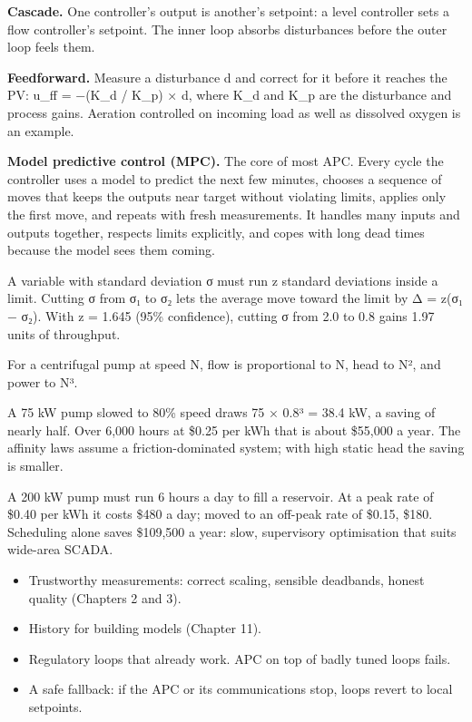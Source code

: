 \textbf{Cascade.} One controller's output is another's setpoint: a level controller sets a flow controller's setpoint. The inner loop absorbs disturbances before the outer loop feels them.

\textbf{Feedforward.} Measure a disturbance d and correct for it before it reaches the PV: u\_ff = −(K\_d / K\_p) × d, where K\_d and K\_p are the disturbance and process gains. Aeration controlled on incoming load as well as dissolved oxygen is an example.

\textbf{Model predictive control (MPC).} The core of most APC. Every cycle the controller uses a model to predict the next few minutes, chooses a sequence of moves that keeps the outputs near target without violating limits, applies only the first move, and repeats with fresh measurements. It handles many inputs and outputs together, respects limits explicitly, and copes with long dead times because the model sees them coming.

 A variable with standard deviation σ must run z standard deviations inside a limit. Cutting σ from σ₁ to σ₂ lets the average move toward the limit by Δ = z(σ₁ − σ₂). With z = 1.645 (95\% confidence), cutting σ from 2.0 to 0.8 gains 1.97 units of throughput.

 For a centrifugal pump at speed N, flow is proportional to N, head to N², and power to N³.

 A 75 kW pump slowed to 80\% speed draws 75 × 0.8³ = 38.4 kW, a saving of nearly half. Over 6,000 hours at \$0.25 per kWh that is about \$55,000 a year. The affinity laws assume a friction-dominated system; with high static head the saving is smaller.

 A 200 kW pump must run 6 hours a day to fill a reservoir. At a peak rate of \$0.40 per kWh it costs \$480 a day; moved to an off-peak rate of \$0.15, \$180. Scheduling alone saves \$109,500 a year: slow, supervisory optimisation that suits wide-area SCADA.

\begin{itemize}
\item Trustworthy measurements: correct scaling, sensible deadbands, honest quality (Chapters 2 and 3).
\item History for building models (Chapter 11).
\item Regulatory loops that already work. APC on top of badly tuned loops fails.
\item A safe fallback: if the APC or its communications stop, loops revert to local setpoints.
\end{itemize}

